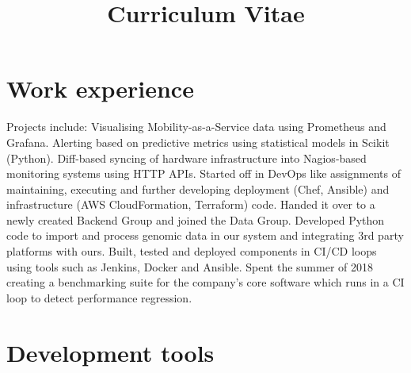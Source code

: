 \documentclass[11pt,a4paper,sans]{moderncv}
\title{Curriculum Vitae}
\begin{document}
\makecvtitle

\section{Work experience}
{Projects include: Visualising Mobility-as-a-Service data using Prometheus and Grafana.
Alerting based on predictive metrics using statistical models in Scikit (Python). 
Diff-based syncing of hardware infrastructure into Nagios-based monitoring systems
using HTTP APIs.}
{Started off in DevOps like assignments of maintaining, executing and
further developing deployment (Chef, Ansible) and infrastructure (AWS
CloudFormation, Terraform) code. Handed it over to a newly created Backend
Group and joined the Data Group. Developed Python code to import and process
genomic data in our system and integrating 3rd party platforms with ours.
Built, tested and deployed components in CI/CD loops using tools such as
Jenkins, Docker and Ansible. Spent the summer of 2018 creating a benchmarking suite
for the company's core software which runs in a CI loop to detect performance
regression.}

\section{Development tools}
\end{document}
